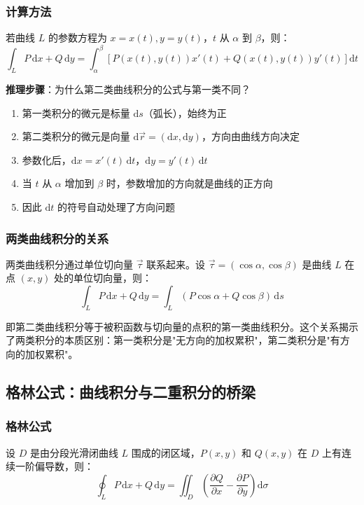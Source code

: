 \subsubsection{计算方法}

若曲线 $L$ 的参数方程为 $x=x(t), y=y(t)$，$t$ 从 $\alpha$ 到 $\beta$，则：
\[
\int_L P\,\mathrm{d}x + Q\,\mathrm{d}y = \int_\alpha^\beta \left[P(x(t),y(t))x'(t) + Q(x(t),y(t))y'(t)\right]\mathrm{d}t
\]

\begin{insightbox}
\textbf{推理步骤}：为什么第二类曲线积分的公式与第一类不同？
\begin{enumerate}[leftmargin=2em]
    \item 第一类积分的微元是标量 $\mathrm{d}s$（弧长），始终为正
    \item 第二类积分的微元是向量 $\mathrm{d}\vec{r} = (\mathrm{d}x, \mathrm{d}y)$，方向由曲线方向决定
    \item 参数化后，$\mathrm{d}x = x'(t)\,\mathrm{d}t$，$\mathrm{d}y = y'(t)\,\mathrm{d}t$
    \item 当 $t$ 从 $\alpha$ 增加到 $\beta$ 时，参数增加的方向就是曲线的正方向
    \item 因此 $\mathrm{d}t$ 的符号自动处理了方向问题
\end{enumerate}
\end{insightbox}

\subsubsection{两类曲线积分的关系}

两类曲线积分通过单位切向量 $\vec{\tau}$ 联系起来。设 $\vec{\tau} = (\cos\alpha, \cos\beta)$ 是曲线 $L$ 在点 $(x,y)$ 处的单位切向量，则：
\[
\int_L P\,\mathrm{d}x + Q\,\mathrm{d}y = \int_L (P\cos\alpha + Q\cos\beta)\,\mathrm{d}s
\]

即第二类曲线积分等于被积函数与切向量的点积的第一类曲线积分。这个关系揭示了两类积分的本质区别：第一类积分是"无方向的加权累积"，第二类积分是"有方向的加权累积"。

\subsection{格林公式：曲线积分与二重积分的桥梁}

\subsubsection{格林公式}

设 $D$ 是由分段光滑闭曲线 $L$ 围成的闭区域，$P(x,y)$ 和 $Q(x,y)$ 在 $D$ 上有连续一阶偏导数，则：
\[
\oint_L P\,\mathrm{d}x + Q\,\mathrm{d}y = \iint_D \left(\frac{\partial Q}{\partial x} - \frac{\partial P}{\partial y}\right)\mathrm{d}\sigma
\]

